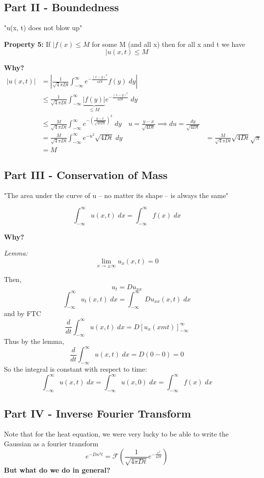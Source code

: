\documentclass[12pt]{article}
\newcommand{\F}{\mathcal{F}}
\begin{document}
\subsection*{Part II - Boundedness}
"u(x, t) does not blow up"

\textbf{Property 5: } If $|f(x) \leq M$ for some M (and all x) then for all x and t we have 
\[|u(x, t) \leq M\]

\textbf{Why?}
\begin{align*}
    |u(x, t)| &= \left|\frac{1}{\sqrt4\pi D t} \int_{-\infty}^\infty e^{-\frac{(x - y)^2}{4Dt}} f(y) \; dy\right|\\
    &\leq \frac{1}{\sqrt4\pi D t} \int_{-\infty}^\infty \underbrace{|f(y)|}_{\leq M} e^{-\frac{(x - y)^2}{4Dt}}\; dy\\
    &\leq \frac{M}{\sqrt4\pi Dt} \int_{-\infty}^\infty e^{-\left(\frac{y - x}{\sqrt{4\pi Dt}}\right)^2}\; dy \quad u = \frac{y - x}{\sqrt{4Dt}} \implies du = \frac{dy}{\sqrt{4Dt}}\\
    &= \frac{M}{\sqrt4\pi Dt} \int_{-\infty}^\infty e^{-u^2}\sqrt{4Dt}\; dy 
    &= \frac{M}{\sqrt4\pi Dt} \sqrt{4Dt} \sqrt{\pi}\\
    &= M
\end{align*}

\subsection*{Part III - Conservation of Mass}
"The area under the curve of u -- no matter its shape -- is always the same"

\[\int_{-\infty}^\infty u(x, t)\; dx =\int_{-\infty}^\infty f(x) \; dx \]

\textbf{Why?}

\emph{Lemma:} 
\[\lim_{x \to \pm \infty} u_x(x, t) = 0\]

Then,
\[u_t = Du_{xx}\]
\[\int_{-\infty}^\infty u_t(x, t)\; dx = \int_{-\infty}^\infty Du_{xx}(x, t)\; dx\]
and by FTC 
\[\frac{d}{dt}\int_{-\infty}^\infty u(x, t) \; dx = D\left[u_x(xm t)\right]_{-\infty}^\infty\]
Thus by the lemma,
\[\frac{d}{dt}\int_{-\infty}^\infty u(x, t) \; dx = D(0- 0) = 0\]
So the integral is constant with respect to time:
\[\int_{-\infty}^\infty u(x, t) \; dx = \int_{-\infty}^\infty u(x, 0) \; dx =\int_{-\infty}^\infty f(x) \; dx\]

\subsection*{Part IV - Inverse Fourier Transform}
Note that for the heat equation, we were very lucky to be able to write the Gaussian as a fourier transform
\[e^{-D\kappa^2t} = \F\left(\frac{1}{\sqrt{4\pi Dt}}e^{-\frac{x^2}{4Dt}}\right)\]
\textbf{But what do we do in general?}
\end{document}
